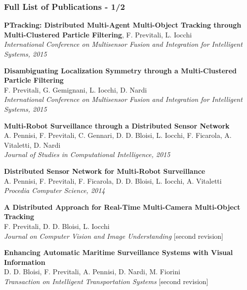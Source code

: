 \begin{frame}
	\frametitle{Full List of Publications - 1/2}
	
	\vspace{0.3cm}
	
	\scriptsize
	\textbf{PTracking: Distributed Multi-Agent Multi-Object Tracking through Multi-Clustered Particle
	Filtering},	F. Previtali, L. Iocchi \\
	\emph{International Conference on Multisensor Fusion and Integration for Intelligent Systems,
	2015} \\
	
	\vspace{0.15cm}
	
	\textbf{Disambiguating Localization Symmetry through a Multi-Clustered Particle Filtering} \\
	F. Previtali, G. Gemignani, L. Iocchi, D. Nardi \\
	\emph{International Conference on Multisensor Fusion and Integration for Intelligent Systems,
	2015} \\
	
	\vspace{0.15cm}
	
	\textbf{Multi-Robot Surveillance through a Distributed Sensor Network} \\
	A. Pennisi, F. Previtali, C. Gennari, D. D. Bloisi, L. Iocchi, F. Ficarola, A. Vitaletti, D.
	Nardi \\
	\emph{Journal of Studies in Computational Intelligence, 2015} \\
	
	\vspace{0.15cm}
	
	\textbf{Distributed Sensor Network for Multi-Robot Surveillance} \\
	A. Pennisi, F. Previtali, F. Ficarola, D. D. Bloisi, L. Iocchi, A. Vitaletti \\
	\emph{Procedia Computer Science, 2014} \\
	
	\vspace{0.15cm}
	
	\textbf{A Distributed Approach for Real-Time Multi-Camera Multi-Object Tracking} \\
	F. Previtali, D. D. Bloisi, L. Iocchi \\
	\emph{Journal on Computer Vision and Image Understanding} [second revision] \\
	
	\vspace{0.15cm}
	
	\textbf{Enhancing Automatic Maritime Surveillance Systems with Visual Information} \\
	D. D. Bloisi, F. Previtali, A. Pennisi, D. Nardi, M. Fiorini \\
	\emph{Transaction on Intelligent Transportation Systems} [second revision] \\
\end{frame}


